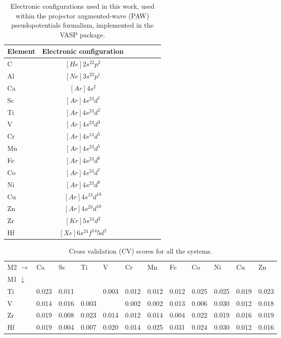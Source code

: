 \documentclass[preprint,amsmath,amssymb,aps, prb,showkeys]{revtex4-1}
\begin{document}
\begin{table}[h!]
\centering
\setlength{\tabcolsep}{0.56cm}
\setlength\extrarowheight{2.5pt}
\begin{tabular}{lcccccc}
\hline \hline
Element  & Electronic configuration \\
\hline 
C   & $[He]2s^22p^2$ \\
Al  & $[Ne]3s^23p^1$ \\
Ca  & $[Ar]4s^2$ \\
Sc  & $[Ar]4s^23d^1$ \\
Ti  & $[Ar]4s^23d^2$ \\
V   & $[Ar]4s^23d^3$ \\
Cr  & $[Ar]4s^13d^5$ \\
Mn  & $[Ar]4s^23d^5$ \\
Fe  & $[Ar]4s^23d^6$ \\
Co  & $[Ar]4s^23d^7$ \\
Ni  & $[Ar]4s^23d^8$ \\
Cu  & $[Ar]4s^13d^{10}$ \\
Zn  & $[Ar]4s^23d^{10}$ \\
Zr  & $[Kr]5s^24d^2$ \\
Hf  & $[Xe]6s^24f^{14}5d^2$ \\
\hline \hline
\end{tabular}
\caption{Electronic configurations used in this work, used within the projector augmented-wave (PAW) pseudopotentials formalism, implemented in the VASP package.}
\label{tab:ele_config}
\end{table}

\newpage

\begin{table}[]
\centering
\begin{tabular}{llllllllllll}
\hline \hline
M2 $\rightarrow$ & Ca    & Sc    & Ti    & V     & Cr    & Mn    & Fe    & Co    & Ni    & Cu    & Zn    \\
M1 $\downarrow$  &       &       &       &       &       &       &       &       &       &       &       \\
\hline
Ti               & 0.023 & 0.011 &       & 0.003 & 0.012 & 0.012 & 0.012 & 0.025 & 0.025 & 0.019 & 0.023 \\
V                & 0.014 & 0.016 & 0.003 &       & 0.002 & 0.002 & 0.013 & 0.006 & 0.030 & 0.012 & 0.018 \\
Zr               & 0.019 & 0.008 & 0.023 & 0.014 & 0.012 & 0.014 & 0.004 & 0.022 & 0.019 & 0.016 & 0.019 \\
Hf               & 0.019 & 0.004 & 0.007 & 0.020 & 0.014 & 0.025 & 0.031 & 0.024 & 0.030 & 0.012 & 0.016 \\
\hline \hline
\end{tabular}
\caption{Cross validation (CV) scores for all the systems.}
\label{CV}
\end{table}




%
\end{document}
